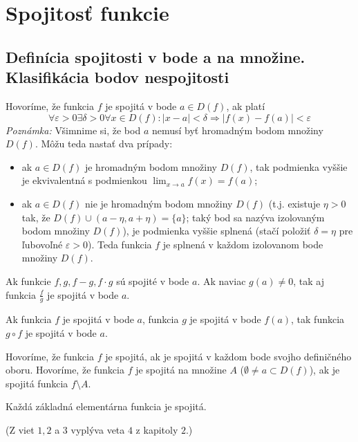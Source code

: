 \chapter{Spojitosť funkcie}%

\section{Definícia spojitosti v bode a na množine. Klasifikácia bodov nespojitosti}
Hovoríme, že funkcia $f$ je spojitá v bode $a \in D(f)$, ak platí
 $$\forall \varepsilon > 0 \exists \delta > 0 \forall x \in D(f):|x-a|<\delta \Rightarrow |f(x)-f(a)|< \varepsilon$$
 \textit{Poznámka:} Všimnime si, že bod $a$ nemusí byť hromadným bodom množiny $D(f)$. Môžu teda nastať dva prípady:
 \begin{itemize}
 \item ak $a \in D(f)$ je hromadným bodom množiny $D(f)$, tak podmienka vyššie je ekvivalentná s podmienkou $\lim_{x \rightarrow a} f(x)=f(a)$;
 \item ak $a \in D(f)$ nie je hromadným bodom množiny $D(f)$ (t.j. existuje $\eta > 0 $ tak, že $D(f) \cup (a-\eta,a+\eta)=\{ a\}$; taký bod sa nazýva izolovaným bodom množiny $D(f)$), je podmienka vyššie splnená (stačí položiť $\delta=\eta$ pre ľubovoľné $\varepsilon > 0$). Teda funkcia $f$ je splnená v každom izolovanom bode množiny $D(f)$.
 \end{itemize}

 \begin{veta}
 Ak funkcie $f,g,f-g,f \cdot g$ sú spojité v bode $a$. Ak naviac $g(a) \neq 0$, tak aj funkcia $\frac{f}{g}$ je spojitá v bode $a$.
 \end{veta}

 \begin{veta}
 Ak funkcia $f$ je spojitá v bode $a$, funkcia $g$ je spojitá v bode $f(a)$, tak funkcia $g \circ f$ je spojitá v bode $a$.

 Hovoríme, že funkcia $f$ je spojitá, ak je spojitá v každom bode svojho definičného oboru. Hovoríme, že funkcia $f$ je spojitá na množine $A$ ($\emptyset \neq a \subset D(f)$), ak je spojitá funkcia $f \setminus A$.
 \end{veta}

 \begin{veta}
 Každá základná elementárna funkcia je spojitá.
 \end{veta}

 (Z viet $1,2$ a $3$ vyplýva veta $4$ z kapitoly $2.$)

